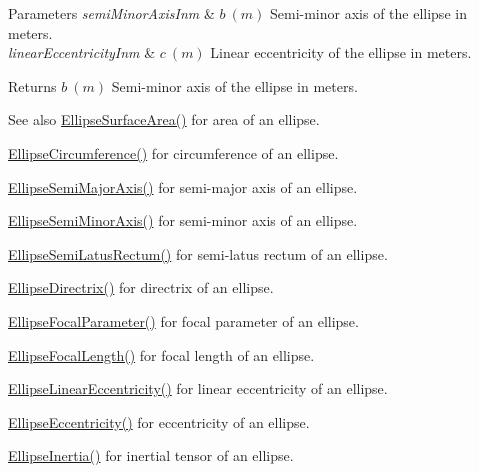 \begin{DoxyParams}{Parameters}
{\em semi\+Minor\+Axis\+Inm} & $ b\ (m)$ Semi-\/minor axis of the ellipse in meters. \\
\hline
{\em linear\+Eccentricity\+Inm} & $ c\ (m)$ Linear eccentricity of the ellipse in meters. \\
\hline
\end{DoxyParams}
\begin{DoxyReturn}{Returns}
$ b\ (m)$ Semi-\/minor axis of the ellipse in meters. 
\end{DoxyReturn}
\begin{DoxySeeAlso}{See also}
\mbox{\hyperlink{group___e_g_x_math-_geometry-2_d-_ellipse-_surface_area_ga4ce8c8323e9718ce5458f4ab7f6d823d}{Ellipse\+Surface\+Area()}} for area of an ellipse. 

\mbox{\hyperlink{group___e_g_x_math-_geometry-2_d-_ellipse-_circumference_ga4172802ac674eb53467b44928ac635c7}{Ellipse\+Circumference()}} for circumference of an ellipse. 

\mbox{\hyperlink{group___e_g_x_math-_geometry-2_d-_ellipse-_semi_major_axis_ga646a2ca065f4ac3f666a9ea22f3bb527}{Ellipse\+Semi\+Major\+Axis()}} for semi-\/major axis of an ellipse. 

\mbox{\hyperlink{group___e_g_x_math-_geometry-2_d-_ellipse-_semi_minor_axis_gae461acf3333565d69527dd86e9aa2b32}{Ellipse\+Semi\+Minor\+Axis()}} for semi-\/minor axis of an ellipse. 

\mbox{\hyperlink{group___e_g_x_math-_geometry-2_d-_ellipse-_semi_latus_rectum_gacfd1844eb4ef3d1ee3c0b460a6442ae6}{Ellipse\+Semi\+Latus\+Rectum()}} for semi-\/latus rectum of an ellipse. 

\mbox{\hyperlink{group___e_g_x_math-_geometry-2_d-_ellipse-_directrix_gace8f72a8efbc9c18d3eb689151405106}{Ellipse\+Directrix()}} for directrix of an ellipse. 

\mbox{\hyperlink{group___e_g_x_math-_geometry-2_d-_ellipse-_focal_parameter_ga4cd01a38c72c092ef9791351948bf69b}{Ellipse\+Focal\+Parameter()}} for focal parameter of an ellipse. 

\mbox{\hyperlink{group___e_g_x_math-_geometry-2_d-_ellipse-_focal_length_gab8d63de7640c880cfecaeada6f2afdac}{Ellipse\+Focal\+Length()}} for focal length of an ellipse. 

\mbox{\hyperlink{group___e_g_x_math-_geometry-2_d-_ellipse-_linear_eccentricity_gac70b3010e30aa8b73deb50fe2b9b9a91}{Ellipse\+Linear\+Eccentricity()}} for linear eccentricity of an ellipse. 

\mbox{\hyperlink{group___e_g_x_math-_geometry-2_d-_ellipse-_eccentricity_ga6a0a7fba17f782616894cfc447628c33}{Ellipse\+Eccentricity()}} for eccentricity of an ellipse. 

\mbox{\hyperlink{group___e_g_x_math-_geometry-2_d-_ellipse-_inertia_ga10a3049c2f04b50f271fb01dc62e4cf8}{Ellipse\+Inertia()}} for inertial tensor of an ellipse. 
\end{DoxySeeAlso}
